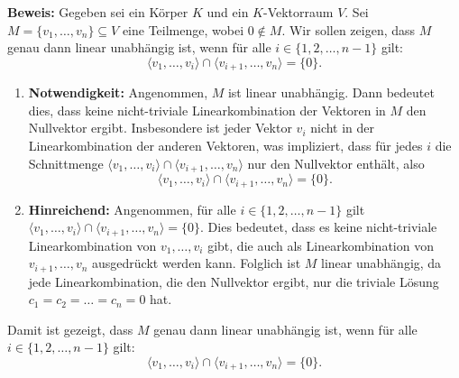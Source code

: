 \documentclass[11pt]{article}
\begin{document}
\textbf{Beweis:} Gegeben sei ein Körper \( K \) und ein \( K \)-Vektorraum \( V \). Sei \( M = \{v_1, \dots, v_n\} \subseteq V \) eine Teilmenge, wobei \( 0 \notin M \). Wir sollen zeigen, dass \( M \) genau dann linear unabhängig ist, wenn für alle \( i \in \{1, 2, \dots, n-1\} \) gilt:
\[
\langle v_1, \dots, v_i \rangle \cap \langle v_{i+1}, \dots, v_n \rangle = \{0\}.
\]

\begin{enumerate}
    \item \textbf{Notwendigkeit:} Angenommen, \( M \) ist linear unabhängig. Dann bedeutet dies, dass keine nicht-triviale Linearkombination der Vektoren in \( M \) den Nullvektor ergibt. Insbesondere ist jeder Vektor \( v_i \) nicht in der Linearkombination der anderen Vektoren, was impliziert, dass für jedes \( i \) die Schnittmenge \( \langle v_1, \dots, v_i \rangle \cap \langle v_{i+1}, \dots, v_n \rangle \) nur den Nullvektor enthält, also
    \[
    \langle v_1, \dots, v_i \rangle \cap \langle v_{i+1}, \dots, v_n \rangle = \{0\}.
    \]

    \item \textbf{Hinreichend:} Angenommen, für alle \( i \in \{1, 2, \dots, n-1\} \) gilt \( \langle v_1, \dots, v_i \rangle \cap \langle v_{i+1}, \dots, v_n \rangle = \{0\} \). Dies bedeutet, dass es keine nicht-triviale Linearkombination von \( v_1, \dots, v_i \) gibt, die auch als Linearkombination von \( v_{i+1}, \dots, v_n \) ausgedrückt werden kann. Folglich ist \( M \) linear unabhängig, da jede Linearkombination, die den Nullvektor ergibt, nur die triviale Lösung \( c_1 = c_2 = \dots = c_n = 0 \) hat.
\end{enumerate}

Damit ist gezeigt, dass \( M \) genau dann linear unabhängig ist, wenn für alle \( i \in \{1, 2, \dots, n-1\} \) gilt:
\[
\langle v_1, \dots, v_i \rangle \cap \langle v_{i+1}, \dots, v_n \rangle = \{0\}.
\]






\end{document}
